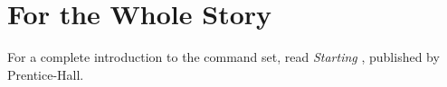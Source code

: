 \section{For the Whole Story}
For a complete introduction to the \Forth{} command set, read
\emph{Starting \Forth{}}, published by Prentice-Hall.%
%
